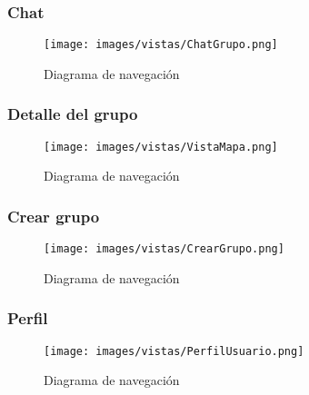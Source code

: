 \subsubsection{Chat}
\begin{figure}[H]
        \centering
        \texttt{[image: images/vistas/ChatGrupo.png]}
        \caption{Diagrama de navegación}
        \label{fig:Vista chat grupo}
\end{figure}
\subsubsection{Detalle del grupo}
\begin{figure}[H]
        \centering
        \texttt{[image: images/vistas/VistaMapa.png]}
        \caption{Diagrama de navegación}
        \label{fig:Vista detalle del grupo}
\end{figure}
\subsubsection{Crear grupo}
\begin{figure}[H]
        \centering
        \texttt{[image: images/vistas/CrearGrupo.png]}
        \caption{Diagrama de navegación}
        \label{fig:Vista Crear Grupo}
\end{figure}
\subsubsection{Perfil}
\begin{figure}[H]
        \centering
        \texttt{[image: images/vistas/PerfilUsuario.png]}
        \caption{Diagrama de navegación}
        \label{fig:Vista Perfil}
\end{figure}





